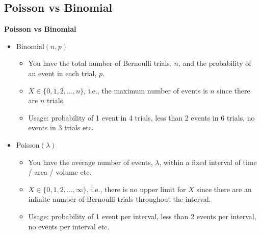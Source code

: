 \documentclass[compress]{beamer}        %
\makeatletter
\newcommand{\tcb}{\textcolor{beamer@blendedblue}}
\makeatother
\begin{document}
\subsection{Poisson vs Binomial}
\begin{frame}{\bf \tcb{Poisson vs Binomial}}
\begin{itemize}\itemsep0.4cm
\item Binomial$(n, p)$
\begin{itemize}\itemsep0.2cm
\item You have the total number of Bernoulli trials, $n$, and the probability of an event in each trial, $p$.
\item $X \in \{0,1,2,\ldots, n\}$, i.e., the maximum number of events is $n$ since there are $n$ trials.
\item Usage: probability of 1 event in 4 trials, less than 2 events in 6 trials, no events in 3 trials etc.
\end{itemize}
\item Poisson$(\lambda)$
\begin{itemize}\itemsep0.2cm
\item You have the average number of events, $\lambda$, within a fixed interval of time / area / volume etc.
\item $X \in \{0,1,2,\ldots, \infty\}$, i.e., there is no upper limit for $X$ since there are an infinite number of Bernoulli trials throughout the interval.
\item Usage: probability of 1 event per interval, less than 2 events per interval, no events per interval etc.
\end{itemize}
\end{itemize}

\end{frame}
\end{document}
